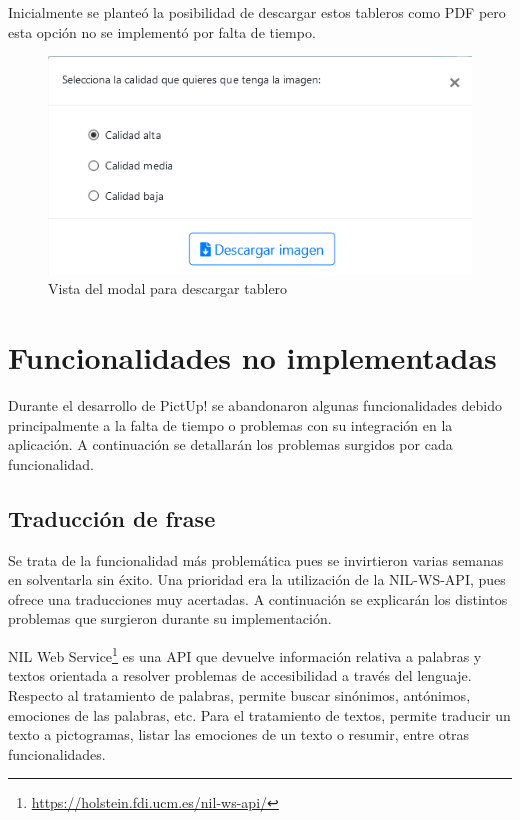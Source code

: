 Inicialmente se planteó la posibilidad de descargar estos tableros como PDF pero esta opción no se implementó por falta de tiempo.

\begin{figure}[h!]
	\centering
	\includegraphics[width=0.7\linewidth]{Imagenes/Bitmap/modalDescargarTablero}
	\caption{Vista del modal para descargar tablero}
	\label{fig:modaldescargartablero}
\end{figure}



\section{Funcionalidades no implementadas}
\label{cap5:noimplementadas}

Durante el desarrollo de PictUp! se abandonaron algunas funcionalidades debido principalmente a la falta de tiempo o problemas con su integración en la aplicación. A continuación se detallarán los problemas surgidos por cada funcionalidad. 


\subsection{Traducción de frase}
Se trata de la funcionalidad más problemática pues se invirtieron varias semanas en solventarla sin éxito. Una prioridad era la utilización de la NIL-WS-API, pues ofrece una traducciones muy acertadas. A continuación se explicarán los distintos problemas que surgieron durante su implementación.  

\label{cap5:sec:nilgroup}

NIL Web Service\footnote{\url{https://holstein.fdi.ucm.es/nil-ws-api/}} es una API que devuelve información relativa a palabras y textos orientada a resolver problemas de accesibilidad a través del lenguaje. Respecto al tratamiento de palabras, permite buscar sinónimos, antónimos, emociones de las palabras, etc. Para el tratamiento de textos, permite  traducir un texto a pictogramas, listar las emociones de un texto o resumir, entre otras funcionalidades. 


